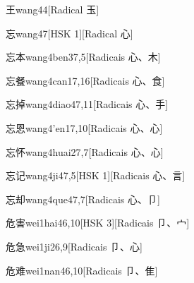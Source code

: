\begin{entry}{王}{wang4}{4}[Radical ⽟]
\end{entry}

\begin{entry}{忘}{wang4}{7}[HSK 1][Radical ⼼]
\end{entry}

\begin{entry}{忘本}{wang4ben3}{7,5}[Radicais ⼼、⽊]
\end{entry}

\begin{entry}{忘餐}{wang4can1}{7,16}[Radicais ⼼、⾷]
\end{entry}

\begin{entry}{忘掉}{wang4diao4}{7,11}[Radicais ⼼、⼿]
\end{entry}

\begin{entry}{忘恩}{wang4'en1}{7,10}[Radicais ⼼、⼼]
\end{entry}

\begin{entry}{忘怀}{wang4huai2}{7,7}[Radicais ⼼、⼼]
\end{entry}

\begin{entry}{忘记}{wang4ji4}{7,5}[HSK 1][Radicais ⼼、⾔]
\end{entry}

\begin{entry}{忘却}{wang4que4}{7,7}[Radicais ⼼、⼙]
\end{entry}

\begin{entry}{危害}{wei1hai4}{6,10}[HSK 3][Radicais ⼙、⼧]
\end{entry}

\begin{entry}{危急}{wei1ji2}{6,9}[Radicais ⼙、⼼]
\end{entry}

\begin{entry}{危难}{wei1nan4}{6,10}[Radicais ⼙、⾫]
\end{entry}

